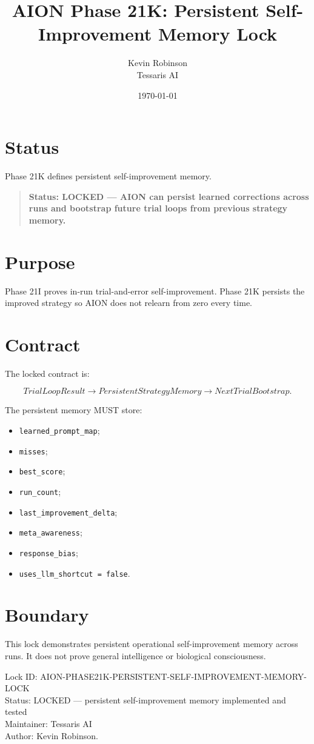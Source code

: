 \documentclass[11pt,a4paper]{article}
\title{\textbf{AION Phase 21K: Persistent Self-Improvement Memory Lock}}
\author{Kevin Robinson\\Tessaris AI}
\date{\today}
\begin{document}
\maketitle

\section{Status}

Phase 21K defines persistent self-improvement memory.

\begin{quote}
\textbf{Status: LOCKED --- AION can persist learned corrections across runs and bootstrap future trial loops from previous strategy memory.}
\end{quote}

\section{Purpose}

Phase 21I proves in-run trial-and-error self-improvement. Phase 21K persists the improved strategy so AION does not relearn from zero every time.

\section{Contract}

The locked contract is:

\[
TrialLoopResult \rightarrow PersistentStrategyMemory \rightarrow NextTrialBootstrap.
\]

The persistent memory MUST store:

\begin{itemize}
  \item \texttt{learned\_prompt\_map};
  \item \texttt{misses};
  \item \texttt{best\_score};
  \item \texttt{run\_count};
  \item \texttt{last\_improvement\_delta};
  \item \texttt{meta\_awareness};
  \item \texttt{response\_bias};
  \item \texttt{uses\_llm\_shortcut = false}.
\end{itemize}

\section{Boundary}

This lock demonstrates persistent operational self-improvement memory across runs. It does not prove general intelligence or biological consciousness.

\bigskip

\noindent
Lock ID: AION-PHASE21K-PERSISTENT-SELF-IMPROVEMENT-MEMORY-LOCK\\
Status: LOCKED --- persistent self-improvement memory implemented and tested\\
Maintainer: Tessaris AI\\
Author: Kevin Robinson.
\end{document}
